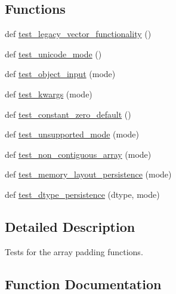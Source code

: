 \subsection*{Functions}
\begin{DoxyCompactItemize}
\item 
def \hyperlink{namespacenumpy_1_1lib_1_1tests_1_1test__arraypad_a05bfd29979e044249690ce4d1a713d36}{test\+\_\+legacy\+\_\+vector\+\_\+functionality} ()
\item 
def \hyperlink{namespacenumpy_1_1lib_1_1tests_1_1test__arraypad_a46d2f2c6aa1d13182a3c65b335b43383}{test\+\_\+unicode\+\_\+mode} ()
\item 
def \hyperlink{namespacenumpy_1_1lib_1_1tests_1_1test__arraypad_ae6b6d85cf8b2c6db82c14c2ce22c203a}{test\+\_\+object\+\_\+input} (mode)
\item 
def \hyperlink{namespacenumpy_1_1lib_1_1tests_1_1test__arraypad_ab6e01ac8cc974a20d90e8fff40bfb788}{test\+\_\+kwargs} (mode)
\item 
def \hyperlink{namespacenumpy_1_1lib_1_1tests_1_1test__arraypad_affd0aae32cc83c16d47f17ad9429223f}{test\+\_\+constant\+\_\+zero\+\_\+default} ()
\item 
def \hyperlink{namespacenumpy_1_1lib_1_1tests_1_1test__arraypad_a40338e9e9e296134b628470438a4c502}{test\+\_\+unsupported\+\_\+mode} (mode)
\item 
def \hyperlink{namespacenumpy_1_1lib_1_1tests_1_1test__arraypad_a4be507414d5014c61631762d59a49ac5}{test\+\_\+non\+\_\+contiguous\+\_\+array} (mode)
\item 
def \hyperlink{namespacenumpy_1_1lib_1_1tests_1_1test__arraypad_af4aaba19dee3edee7a0e599f7c75450e}{test\+\_\+memory\+\_\+layout\+\_\+persistence} (mode)
\item 
def \hyperlink{namespacenumpy_1_1lib_1_1tests_1_1test__arraypad_ace5a3900cfea4630a8615de4840dc28a}{test\+\_\+dtype\+\_\+persistence} (dtype, mode)
\end{DoxyCompactItemize}


\subsection{Detailed Description}
\begin{DoxyVerb}Tests for the array padding functions.\end{DoxyVerb}
 

\subsection{Function Documentation}
\mbox{\label{namespacenumpy_1_1lib_1_1tests_1_1test__arraypad_affd0aae32cc83c16d47f17ad9429223f}} 

